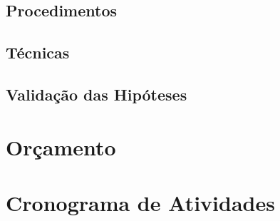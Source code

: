 \subsection{Procedimentos}



\subsection{Técnicas}

\subsection{Validação das Hipóteses}


\section{Orçamento} \label{sec:budget}


\section{Cronograma de Atividades} \label{sec:schedule_activities_table}

